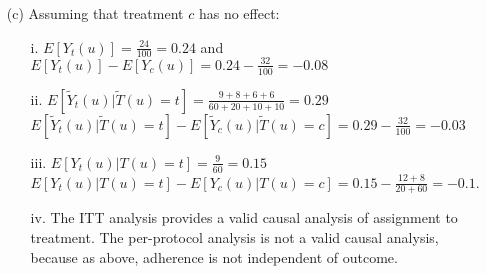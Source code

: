 \documentclass[11pt,a4paper]{article}
\begin{document}
\begin{enumerate}
\item[(c)] Assuming that treatment $c$ has no effect:
\begin{enumerate}
\item[i.] $ E[Y_t(u)]= \frac{24}{100}=0.24$ and 
 $E[Y_t(u)]-E[Y_c(u)]= 0.24-\frac{32}{100}=-0.08 $
\item[ii.] $E[\tilde{Y}_t(u)|\tilde{T}(u)=t]= \frac{9+8+6+6}{60+20+10+10}=0.29 $ \\
 $E[\tilde{Y}_t(u)|\tilde{T}(u)=t]-E[\tilde{Y}_c(u)|\tilde{T}(u)=c]= 0.29-\frac{32}{100}=-0.03$
\item[iii.] $E[Y_t(u)|T(u)=t]=\frac{9}{60}=0.15$ \\
$E[Y_t(u)|T(u)=t]-E[Y_c(u)|T(u)=c]=0.15-\frac{12+8}{20+60}=-0.1$.
\item[iv.] The ITT analysis provides a valid causal analysis of assignment to treatment. The per-protocol analysis is not a valid causal analysis, because as above, adherence is not independent of outcome.

\end{enumerate}

\end{enumerate}
\end{document}
